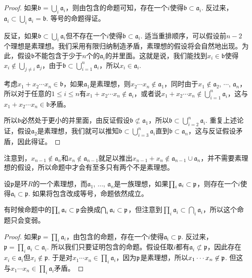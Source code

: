 \begin{proof}
	如果$\mathfrak{b}=\bigcup_i \mathfrak{a}_i$，则由包含的命题可知，存在一个$i$使得$\mathfrak{b}\subset \mathfrak{a}_i$. 反过来，$\mathfrak{a}_i\subset \bigcup_i \mathfrak{a}_i=\mathfrak{b}$. 等号的命题得证。

	反证，如果$\mathfrak{b}\subset \bigcup_i \mathfrak{a}_i$但不存在一个$i$使得$\mathfrak{b}\subset \mathfrak{a}_i$. 适当重排顺序，可以假设前$n-2$个理想是素理想。我们采用有限归纳制造矛盾，素理想的假设将会自然地出现。为此，假设$\mathfrak{b}$不能包含于少于$n$个的$\mathfrak{a}_i$的并里面。这就是说，我们能找到$x_i\in \mathfrak{b}$使得$x_i\not\in \bigcup_{j\neq i}\mathfrak{a}_j$，由于$\mathfrak{b}\subset \bigcup_{i=1}^n \mathfrak{a}_i$，所以$x_i\in \mathfrak{a}_i$.

	考虑$x_1+x_2\cdots x_n\in \mathfrak{b}$，如果$\mathfrak{a}_1$是素理想，则$x_2\cdots x_n\not\in \mathfrak{a}_1$，同时由于$x_1\not\in \mathfrak{a}_2$, $\cdots$, $\mathfrak{a}_n$，所以对于任意的$1\leq i \leq n$有$x_1+x_2\cdots x_n\not\in \mathfrak{a}_i$，或者说$x_1+x_2\cdots x_n\not\in \bigcup_{i=1}^n \mathfrak{a}_i$，这与$x_1+x_2\cdots x_n\in \mathfrak{b}$矛盾。

	所以$\mathfrak{b}$必然处于更小的并里面，由反证假设$\mathfrak{b}\not\subset \mathfrak{a}_1$，所以$\mathfrak{b}\subset \bigcup_{i=2}^n \mathfrak{a}_i$. 重复上述论证，假设$\mathfrak{a}_2$是素理想，我们就可以推知$\mathfrak{b}\subset \bigcup_{i=3}^n \mathfrak{a}_i$直到$\mathfrak{b}\subset \mathfrak{a}_n$，这与反证假设矛盾，因此得证。 
\end{proof}

注意到，$x_{n-1}\not\in \mathfrak{a}_n$和$x_{n}\not\in \mathfrak{a}_{n-1}$就足以推出$x_{n-1}+x_{n}\not\in \mathfrak{a}_{n-1}\cup \mathfrak{a}_n$，并不需要素理想的假设，所以命题中才会有至多只有两个不是素理想。

\begin{pro} \label{primeau}设$\mathfrak{p}$是环$R$的一个素理想，而$\mathfrak{a}_1$, $\dots$, $\mathfrak{a}_n$是一族理想，如果$\prod_i \mathfrak{a}_i\subset \mathfrak{p}$，则存在一个$i$使得$\mathfrak{a_i}\subset \mathfrak{p}$. 如果将包含改成等号，命题依然成立。
\end{pro}

有时候命题中的$\prod_i \mathfrak{a}_i\subset \mathfrak{p}$会换成$\bigcap_i \mathfrak{a}_i\subset \mathfrak{p}$，但注意到$\prod_i \mathfrak{a}_i\subset \bigcap_i \mathfrak{a}_i$，所以这个命题只会变弱。

\begin{proof}
	如果$\mathfrak{p}=\prod_i \mathfrak{a}_i$，由包含的命题，存在一个$i$使得$\mathfrak{a_i}\subset \mathfrak{p}$. 反过来，$\mathfrak{p}=\prod_i \mathfrak{a}_i\subset \mathfrak{a}_i$. 所以我们只要证明包含的命题。假设任取$i$都有$\mathfrak{a}_i\not\subset \mathfrak{p}$，因此存在$x_i\in\mathfrak{a}_i$但$x_i\not\in \mathfrak{p}$. 于是对$x_1\cdots x_n\in \prod_i \mathfrak{a}_i$，因为$\mathfrak{p}$是素理想，所以$x_1\cdots x_n\not\in \mathfrak{p}$. 但这与$x_1\cdots x_n\in \prod_i \mathfrak{a}_i$矛盾。
\end{proof}

